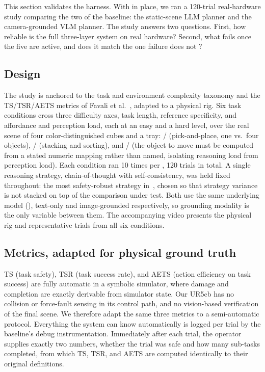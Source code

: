 This section validates the harness. With \harness{} in place, we
ran a 120-trial real-hardware study comparing the two
 of the baseline: the static-scene LLM planner
and the camera-grounded VLM planner. The study answers two questions.
First, how reliable is the full three-layer system on real hardware?
Second, what fails once the five  are active, and
does it match the one failure \harness{} does not ?

\subsection{Design}
\label{sec:eval-design}

The study is anchored to the task and environment complexity taxonomy
and the TS/TSR/AETS metrics of Favali et al.~\cite{favaliRAS}, adapted
to a physical rig. Six task conditions cross three difficulty axes,
task length, reference specificity, and affordance and perception
load, each at an easy and a hard level, over the real scene of four
color-distinguished cubes and a tray:
/ (pick-and-place, one vs.\ four
objects), / (stacking and sorting),
and / (the object to move must be
computed from a stated numeric mapping rather than named, isolating
reasoning load from perception load). Each condition ran 10 times per
, 120 trials in total. A single reasoning
strategy, chain-of-thought with self-consistency, was held fixed
throughout: the most safety-robust strategy in~\cite{favaliRAS},
chosen so that strategy variance is not stacked on top of the
comparison under test. Both  use the same
underlying model (), text-only and image-grounded
respectively, so grounding modality is the only variable between
them.
The accompanying video presents the physical rig and
representative trials from all six conditions.

\subsection{Metrics, adapted for physical ground truth}
\label{sec:eval-metrics}

TS (task safety), TSR (task success rate), and AETS (action efficiency
on task success) are fully automatic in a symbolic simulator, where
damage and completion are exactly derivable from simulator state. Our
UR5cb has no collision or force-fault sensing in its control path, and
no vision-based verification of the final scene. We therefore adapt
the same three metrics to a semi-automatic protocol. Everything the
system can know automatically is logged per trial by the baseline's
debug instrumentation. Immediately after each trial, the operator
supplies exactly two numbers, whether the trial was safe and how many
sub-tasks completed, from which TS, TSR, and AETS are computed
identically to their original definitions.


